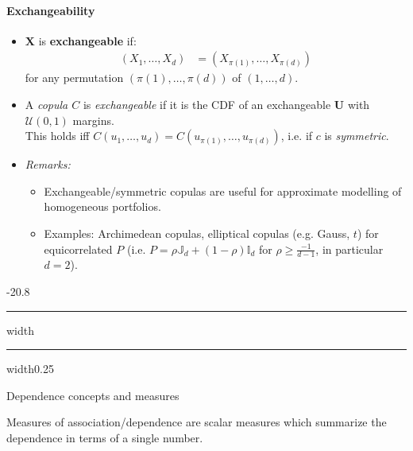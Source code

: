 \documentclass[a4paper,landscape,8pt,fleqn]{scrartcl}
\makeatletter
\renewcommand{\emph}[1]{\textbf{#1}}
\renewcommand{\subsection}{\@startsection{subsection}{1}{0mm}%
{-2\baselineskip}{0.8\baselineskip}%
{\hrule depth 0.2pt width\columnwidth\hrule depth0.75pt
width0.25\columnwidth\vspace*{1.2em}\large\bfseries}}
\makeatother
\begin{document}
\begin{multicols*}{3}
\paragraph{Exchangeability}
\begin{itemize}
\item $\bm X$ is \emph{exchangeable} if:
\begin{align*}
(X_1, \ldots, X_d) &= (X_{\pi(1)}, \ldots, X_{\pi(d)})
\end{align*}
for any permutation $(\pi(1), \ldots, \pi(d))$ of $(1, \ldots, d)$.
\item A \textit{copula $C$} is \textit{exchangeable} if it is the CDF of an exchangeable $\bm U$ with $\mathcal{U}(0,1)$ margins. \\
This holds iff $C(u_1, \ldots, u_d) = C(u_{\pi(1)}, \ldots, u_{\pi(d)})$, i.e. if $c$ is \textit{symmetric}.
\item \textit{Remarks:}
\begin{itemize}
\item Exchangeable/symmetric copulas are useful for approximate modelling of homogeneous portfolios.
\item Examples: Archimedean copulas, elliptical copulas (e.g. Gauss, $t$) for equicorrelated $P$ (i.e. $P = \rho \mathbb{J}_d + (1-\rho) \mathbb{I}_d$ for $\rho \geq \frac{-1}{d-1}$, in particular $d=2$).
\end{itemize}
\end{itemize}

\subsection{Dependence concepts and measures}

Measures of association/dependence are scalar measures which summarize the dependence in terms of a single number.


\end{multicols*}
\end{document}
